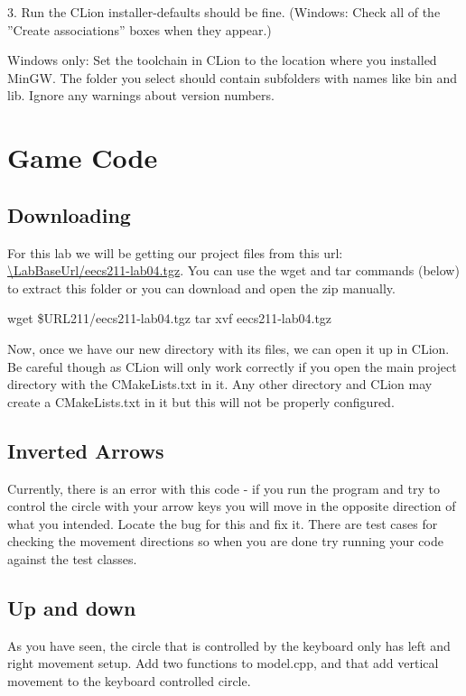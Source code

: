\documentclass{tufte-handout}
\def\ThisLabBase{eecs211-lab04}
\def\ThisLabUrl{\LabBaseUrl/\ThisLabBase.tgz}
\begin{document}
3. Run the CLion installer-defaults should be fine. (Windows: Check all
of the ''Create associations'' boxes when they appear.)

Windows only: Set the toolchain in CLion to the location where you
installed MinGW. The folder you select should contain subfolders with
names like bin and lib. Ignore any warnings about version numbers.

\section{Game Code}

\subsection{Downloading}

For this lab we will be getting our project files from this url:
\url{\ThisLabUrl}. You can use the wget and tar commands (below) to extract this
folder or you can download and open the zip manually.

\begin{CmdLine}
  \prompt wget \$URL211/\ThisLabBase.tgz
  \prompt tar xvf \ThisLabBase.tgz
\end{CmdLine}

Now, once we have our new directory \filename{\ThisLabBase} with its files,
we can open it up in CLion. Be careful though as CLion will only work correctly
if you open the main project directory with the CMakeLists.txt in it. Any other
directory and CLion may create a CMakeLists.txt in it but this will not be
properly configured.

\subsection{Inverted Arrows}

Currently, there is an error with this code - if you run the program and try
to control the circle with your arrow keys you will move in the opposite
direction of what you intended. Locate the bug for this and fix it. There
are test cases for checking the movement directions so when you are done try
running your code against the test classes.

\subsection{Up and down}

As you have seen, the circle that is controlled by the keyboard only has
left and right movement setup. Add two functions to model.cpp,
 and  that
add vertical movement to the keyboard controlled circle.
\end{document}
